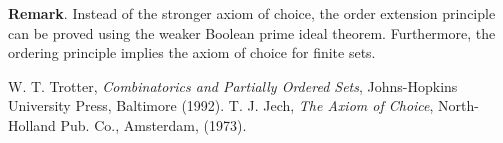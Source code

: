 \documentclass[12pt]{article}
\begin{document}
\textbf{Remark}.  Instead of the stronger axiom of choice, the order extension principle can be proved using the weaker Boolean prime ideal theorem.  Furthermore, the ordering principle implies the axiom of choice for finite sets.

\begin{thebibliography}{8}
 W. T. Trotter, {\em Combinatorics and Partially Ordered Sets}, Johns-Hopkins University Press, Baltimore (1992).
 T. J. Jech, \emph{The Axiom of Choice}, North-Holland Pub. Co., Amsterdam, (1973).
\end{thebibliography}
\end{document}
